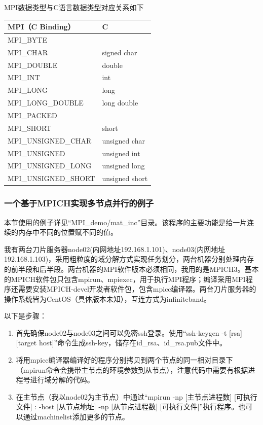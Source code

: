 \documentclass{article}
\begin{document}
					MPI数据类型与C语言数据类型对应关系如下
					\begin{table}
						\centering
						\begin{tabular}{ll}
							\hline
							MPI（C Binding） & C \\
							\hline
							MPI\_BYTE & \\
							MPI\_CHAR & signed char\\
							MPI\_DOUBLE & double\\
							MPI\_INT & int\\
							MPI\_LONG & long\\
							MPI\_LONG\_DOUBLE & long double\\
							MPI\_PACKED & \\
							MPI\_SHORT & short\\
							MPI\_UNSIGNED\_CHAR & unsigned char\\
							MPI\_UNSIGNED & unsigned int\\
							MPI\_UNSIGNED\_LONG & unsigned long\\
							MPI\_UNSIGNED\_SHORT & unsigned short\\
							\hline
						\end{tabular}
					\end{table}
				\subsubsection{一个基于MPICH实现多节点并行的例子}
					本节使用的例子详见``MPI\_demo/mat\_inc''目录。该程序的主要功能是给一片连续的内存中不同的位置赋不同的值。
					
					我有两台刀片服务器node02(内网地址192.168.1.101)、node03(内网地址192.168.1.103)，采用粗粒度的域分解方式实现任务划分，两台机器分别处理内存的前半段和后半段。两台机器的MPI软件版本必须相同，我用的是MPICH3。基本的MPICH软件包只包含mpirun、mpiexec，用于执行MPI程序；编译采用MPI程序还需要安装MPICH-devel开发者软件包，包含mpicc编译器。两台刀片服务器的操作系统皆为CentOS（具体版本未知），互连方式为infiniteband。
					
					以下是步骤：
					\begin{enumerate}
						\item 首先确保node02与node03之间可以免密ssh登录。使用``ssh-keygen -t [rsa] [target host]''命令生成ssh-key，储存在id\_rsa、id\_rsa.pub文件中。
						\item 将用mpicc编译器编译好的程序分别拷贝到两个节点的同一相对目录下（mpirun命令会携带主节点的环境参数到从节点），注意代码中需要有根据进程号进行域分解的代码。
						\item 在主节点（我以node02为主节点）中通过``mpirun -np [主节点进程数] [可执行文件] : -host [从节点地址] -np [从节点进程数] [可执行文件]''执行程序。也可以通过machinelist添加更多的节点。
					\end{enumerate}
					
\end{document}
